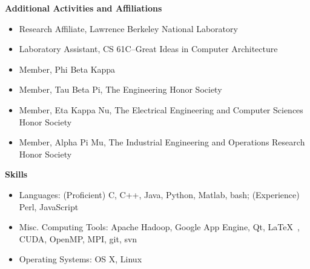 \documentclass[letterpaper,11pt]{article}
\newcommand{\desitem}[1]{\item #1 \vspace{-7pt}}
\newcommand{\resheading}[1]{{\large \colorbox{mygrey}{\begin{minipage}{\textwidth}{\textbf{#1 \vphantom{p\^{E}}}}\end{minipage}}}}
\begin{document}
\resheading{Additional Activities and Affiliations}
\begin{itemize}
    \desitem{Research Affiliate,
    Lawrence Berkeley National Laboratory}
   \desitem{Laboratory Assistant,
    CS 61C--Great Ideas in Computer Architecture}    
    \desitem{Member,
    Phi Beta Kappa}
    \desitem{Member,
    Tau Beta Pi, The Engineering Honor Society}
     \desitem{Member,
    Eta Kappa Nu, The Electrical Engineering and Computer Sciences Honor Society}
    \desitem{Member,
    Alpha Pi Mu, The Industrial Engineering and Operations Research Honor Society}
\end{itemize}

\vspace{0.1in}

\resheading{Skills}
\begin{itemize}
    \desitem{Languages:
                    (Proficient) C, C++, Java, Python, Matlab, bash; (Experience) Perl, JavaScript}
    \desitem{Misc. Computing Tools:
                     Apache Hadoop, Google App Engine, Qt, \LaTeX\ , CUDA, OpenMP, MPI, git, svn}
    \desitem{Operating Systems:
                     OS X, Linux}
\end{itemize}
\end{document}

